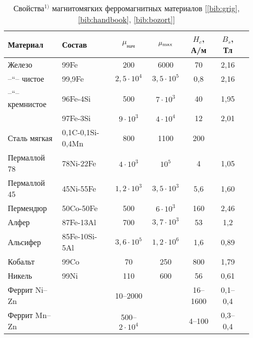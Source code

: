 \begin{booksupplement}
\begin{table}
\caption{Свойства$^{1)}$ магнитомягких ферромагнитных материалов [\ref{bib:grig}, \ref{bib:handbook},
\ref{bib:bozort}]}
\small
 \begin{tabular}{p{2.3cm}p{2cm}ccccc}
 \toprule[1pt]
Материал & Состав & $\mu_{нач}$ & $\mu_{\rm max}$ & $H_c$, А/м & $B_s$, Тл \\
\midrule[1pt]
Железо & 99Fe & 200 & 6000 & 70 & 2,16 \\
--``-- чистое & 99,9Fe & $2,5\cdot 10^4$ & $3,5\cdot 10^5$ & 0,8 & 2,16 \\
--``-- кремнистое & 96Fe-4Si & 500 & $7\cdot 10^3$ & 40 & 1,95 \\
    & 97Fe-3Si & $9\cdot 10^3$ & $4\cdot 10^4$ & 12 & 2,01 \\
Сталь мягкая & 0,1C-0,1Si-0,4Mn & 800 & 1100 & 200 & \\
Пермаллой 78 & 78Ni-22Fe & $4\cdot 10^3$ & $10^5$ & 4 & 1,05 \\
Пермаллой 45 & 45Ni-55Fe & $1,2\cdot 10^3$ & $3,5\cdot 10^3$ & 5,6 & 1,60 \\
Пермендюр & 50Co-50Fe & 500 & $6\cdot 10^3$ & 160 & 2,46 \\
Алфер & 87Fe-13Al & 700 & $3,7\cdot 10^3$ & 53 & 1,2 \\
Альсифер & 85Fe-10Si-5Al & $3,6\cdot 10^5$ & $1,2\cdot 10^6$ & 1,6 & 0,89 \\
Кобальт & 99Co & 70 & 250 & 800 & 1,79 \\
Никель & 99Ni & 110 & 600 & 56 & 0,61 \\
Феррит Ni--Zn & & 10--2000 &  & 16--1600 & 0,1--0,4 \\
Феррит Mn--Zn & & 500--$2\cdot 10^4$ & & 4--100 & 0,3--0,4 \\
\bottomrule
 \end{tabular}\par
\end{table}



\end{booksupplement}

